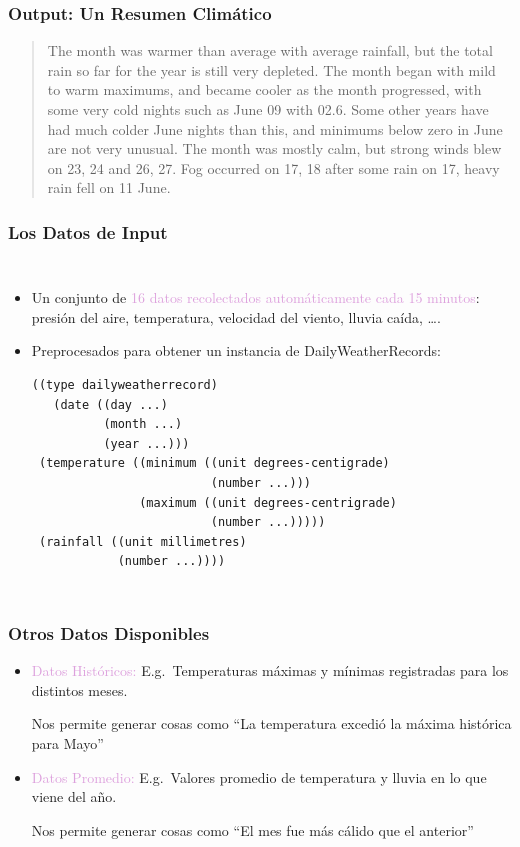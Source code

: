 \documentclass[compress,color=usenames]{beamer}
\newcommand{\mH}[1]{\textcolor{Plum}{#1}}
\begin{document}
\begin{frame}
\frametitle{Output: Un Resumen Clim\'atico}

\begin{quote}
\item { {The month was warmer than average with average rainfall, but the total rain so far for the year is still very depleted. The month began with mild to warm maximums, and became cooler as the month progressed, with some very cold nights such as June 09 with 02.6. Some other years have had much colder June nights than this, and minimums below zero in June are not very unusual. The month was mostly calm, but strong winds blew on 23, 24 and 26, 27. Fog occurred on 17, 18 after some rain on 17, heavy rain fell on 11 June.}}
\end{quote}

\end{frame}

\begin{frame}[fragile]
\frametitle{Los Datos de Input}

\begin{columns}
\begin{itemize}
\item Un conjunto de \mH{16 datos recolectados autom\'aticamente cada 15 minutos}: presi\'on del aire, temperatura, velocidad del viento, lluvia ca\'ida, \ldots.
\item Preprocesados para obtener un instancia de  DailyWeatherRecords:

\begin{verbatim}
((type dailyweatherrecord)
   (date ((day ...)
          (month ...)
          (year ...)))
 (temperature ((minimum ((unit degrees-centigrade)
                         (number ...)))
               (maximum ((unit degrees-centrigrade)
                         (number ...)))))
 (rainfall ((unit millimetres)
            (number ...))))
\end{verbatim}

\end{itemize}
\end{columns}
\end{frame}

\begin{frame}
\frametitle{Otros Datos Disponibles}

\label{f74}
\begin{itemize}
\item  \mH{Datos Hist\'oricos:} E.g.\ Temperaturas m\'aximas y m\'inimas registradas para los distintos meses.

Nos permite generar cosas como ``La temperatura excedi\'o la m\'axima hist\'orica para Mayo''

\item \mH{Datos Promedio:} E.g.\ Valores promedio de temperatura y lluvia en lo que viene del a\~no.

Nos permite generar cosas como ``El mes fue m\'as c\'alido que el anterior'' 
\end{itemize}

\end{frame}
\end{document}
